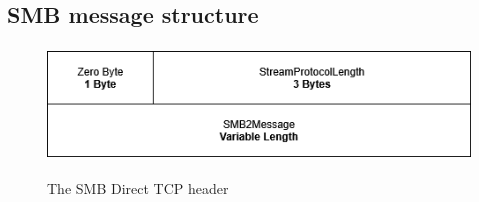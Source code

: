 \documentclass[english, 12pt, a4paper, elec, utf8, a-2b, online]{aaltothesis}
\begin{document}
\subsection{SMB message structure}

\begin{figure}[h]
	\centering
	\includegraphics[alt={A block diagram of the SMB Direct TCP header format, detailing its fields and their sizes.}, height=3cm]{./images/smb_tcp_direct_header.drawio.png}
	\caption{The SMB Direct TCP header}
	\label{fig:direct_tcp_header}
\end{figure}
\end{document}

